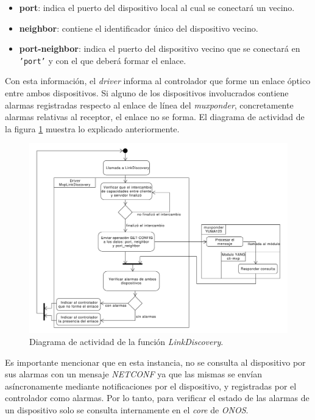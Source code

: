 \begin{itemize}
	\item \textbf{port}: indica el puerto del dispositivo local al cual se conectará un vecino.
    
    \item \textbf{neighbor}: contiene el identificador único del dispositivo vecino.
    
    \item \textbf{port-neighbor}: indica el puerto del dispositivo vecino que se conectará en \texttt{'port'} y con el que deberá formar el enlace.
\end{itemize}

Con esta información, el \textit{driver} informa al controlador que forme un enlace óptico entre ambos dispositivos. Si alguno de los dispositivos involucrados contiene alarmas registradas respecto al enlace de línea del \textit{muxponder}, concretamente alarmas relativas al receptor, el enlace no se forma. El diagrama de actividad de la figura \ref{fig:actividad_link} muestra lo explicado anteriormente.

\begin{figure}[!h]
    \centering
    \includegraphics[scale=0.43]{Figures/actividad_link.pdf}
    \caption{Diagrama de actividad de la función \textit{LinkDiscovery}.}
    \label{fig:actividad_link}
  \end{figure}

  Es importante mencionar que en esta instancia, no se consulta al dispositivo por sus alarmas con un mensaje \textit{NETCONF} ya que las mismas se envían asíncronamente mediante notificaciones por el dispositivo, y registradas por el controlador como alarmas. Por lo tanto, para verificar el estado de las alarmas de un dispositivo solo se consulta internamente en el \textit{core} de \textit{ONOS}.


